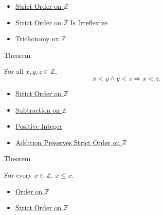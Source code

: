 \begin{dependencies}
\begin{itemize}
  \item \hyperref[def:strict-order-on-z]{Strict Order on $\mathbb{Z}$}
  \item \hyperref[thm:strict-order-on-z-irreflexive]{Strict Order on $\mathbb{Z}$ Is Irreflexive}
  \item \hyperref[thm:trichotomy-on-z]{Trichotomy on $\mathbb{Z}$}
\end{itemize}
\end{dependencies}

\begin{theorembox}{Theorem}
\begin{theorem}
\label{thm:strict-order-on-z-transitive}
For all $x,y,z\in\mathbb{Z}$,
\[
x<y\land y<z \Longrightarrow x<z.
\]
\end{theorem}
\end{theorembox}

\begin{dependencies}
\begin{itemize}
  \item \hyperref[def:strict-order-on-z]{Strict Order on $\mathbb{Z}$}
  \item \hyperref[def:subtraction-on-z]{Subtraction on $\mathbb{Z}$}
  \item \hyperref[def:positive-integer]{Positive Integer}
  \item \hyperref[thm:addition-preserves-strict-order-on-z]{Addition Preserves Strict Order on $\mathbb{Z}$}
\end{itemize}
\end{dependencies}

\begin{theorembox}{Theorem}
\begin{theorem}
\label{thm:order-on-z-reflexive}
For every $x\in\mathbb{Z}$, $x\le x$.
\end{theorem}
\end{theorembox}

\begin{dependencies}
\begin{itemize}
  \item \hyperref[def:order-on-z]{Order on $\mathbb{Z}$}
  \item \hyperref[def:strict-order-on-z]{Strict Order on $\mathbb{Z}$}
\end{itemize}
\end{dependencies}

